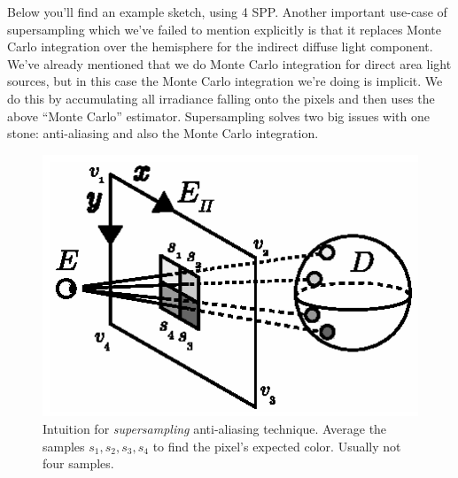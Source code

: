 \documentclass[a4paper, twocolumn]{article}
\begin{document}
            Below you'll find an example sketch, using 4 SPP. Another important use-case of supersampling which we've failed to mention explicitly is that it replaces Monte Carlo integration over the hemisphere for the indirect diffuse  light component. We've already mentioned that we do Monte Carlo integration for direct area light sources, but in this case the Monte Carlo integration we're doing is implicit. We do this by accumulating all irradiance falling onto the pixels and then uses the above ``Monte Carlo'' estimator. Supersampling solves two big issues with one stone: anti-aliasing and also the Monte Carlo integration.

            \begin{figure}[ht]
                \centering
                \includegraphics[width=0.8\linewidth]{share/supersampling.eps}
                \caption{Intuition for \emph{supersampling} anti-aliasing technique. Average the samples \(s_1, s_2, s_3, s_4\) to find the pixel's expected color. Usually not four samples.}
                \label{fig:supersampling}
            \end{figure}
\end{document}
